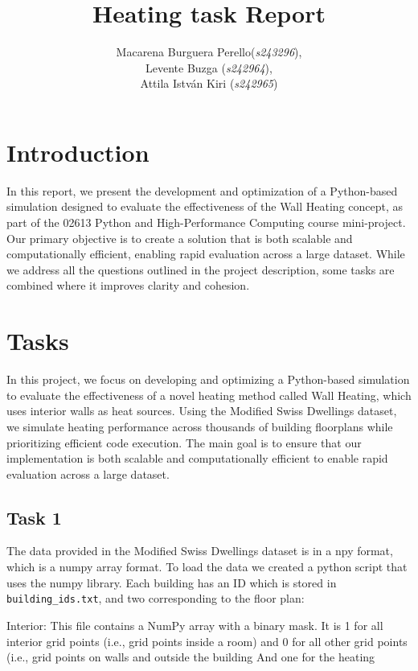 \documentclass[a4paper,12pt]{article}
\title{Heating task Report}
\author{Macarena Burguera Perello(\textit{s243296}), \\
        Levente Buzga (\textit{s242964}), \\
        Attila István Kiri (\textit{s242965})}
\begin{document}
\maketitle


\section{Introduction}

In this report, we present the development and optimization of a Python-based simulation designed to evaluate the effectiveness of the Wall Heating concept, as part of the 02613 Python and High-Performance Computing course mini-project. Our primary objective is to create a solution that is both scalable and computationally efficient, enabling rapid evaluation across a large dataset. While we address all the questions outlined in the project description, some tasks are combined where it improves clarity and cohesion.

\section{Tasks}

In this project, we focus on developing and optimizing a Python-based simulation to evaluate the effectiveness of a novel heating method called Wall Heating, which uses interior walls as heat sources. Using the Modified Swiss Dwellings dataset, we simulate heating performance across thousands of building floorplans while prioritizing efficient code execution. The main goal is to ensure that our implementation is both scalable and computationally efficient to enable rapid evaluation across a large dataset.

\subsection{Task 1}

The data provided in the Modified Swiss Dwellings dataset is in a npy format, which is a numpy array format. To load the data we created a python script that uses the numpy library.
Each building has an ID which is stored in \texttt{building\_ids.txt}, 
and two corresponding to the floor plan:

Interior: This file contains a NumPy array with a binary mask. It is 1 for all
interior grid points (i.e., grid points inside a room) and 0 for all other grid points (i.e., grid points
on walls and outside the building
And one for the heating 
\end{document}
